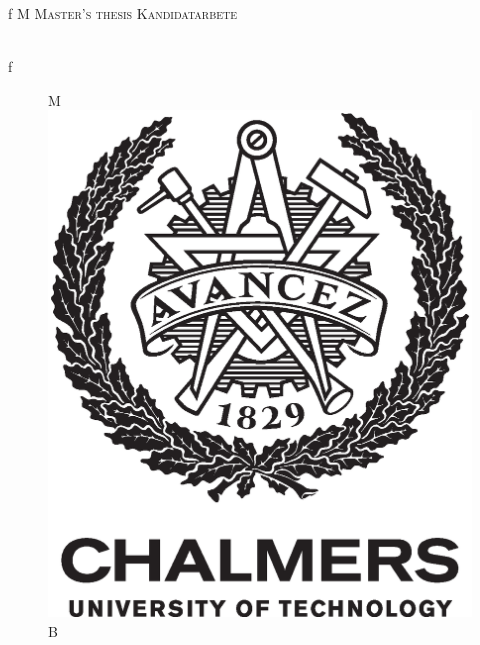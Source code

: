 \begingroup %
\newpage
\thispagestyle{empty}
\begin{center}
    \if\thesisStatus f
        \textsc{\large
        \if\thesisType M
            Master's thesis
        \else
            Kandidatarbete
        \fi
        \thesisYear
        }
    \else
        \mbox{}
    \fi
    \\[4cm]
    \textbf{\Large \thesisTitle} \\[1cm]
    {\large \thesisAuthor}

    \if\thesisStatus f
        \vfill
        \begin{figure}[H]
        \centering
        \if\thesisType M
        \includegraphics[width=0.2\pdfpagewidth]{template/figures/AvancezChalmersU_black_centered.eps} \\
        \fi
        \if\thesisType B

\end{figure}
\end{center}
